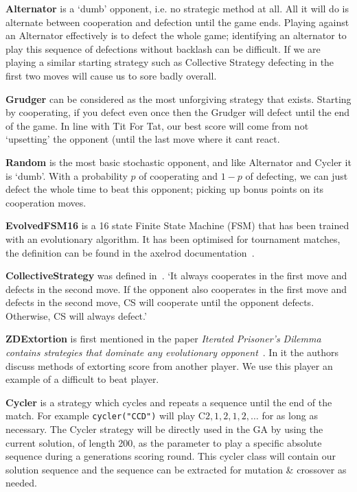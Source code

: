 \textbf{Alternator} is a `dumb' opponent, i.e. no strategic method at all. All it will do is alternate between cooperation and defection until the game ends. 
Playing against an Alternator effectively is to defect the whole game; identifying an alternator to play this sequence of defections without backlash can be difficult.
If we are playing a similar starting strategy such as Collective Strategy defecting in the first two moves will cause us to sore badly overall.

\textbf{Grudger} can be considered as the most unforgiving strategy that exists.
Starting by cooperating, if you defect even once then the Grudger will defect until the end of the game.
In line with Tit For Tat, our best score will come from not `upsetting' the opponent (until the last move where it cant react.

\textbf{Random} is the most basic stochastic opponent, and like Alternator and Cycler it is `dumb'. 
With a probability $p$ of cooperating and $1-p$ of defecting, we can just defect the whole time to beat this opponent; picking up bonus points on its cooperation moves.

\textbf{EvolvedFSM16} is a 16 state Finite State Machine (FSM) that has been trained with an evolutionary algorithm. It has been optimised for tournament matches, the definition can be found in the axelrod documentation~\cite{axelrodproject}.

\textbf{CollectiveStrategy} was defined in~\cite{li2009strategy}. ‘It always cooperates in the first move and defects in the second move. If the opponent also cooperates in the first move and defects in the second move, CS will cooperate until the opponent defects. Otherwise, CS will always defect.’

\textbf{ZDExtortion} is first mentioned in the paper \textit{Iterated Prisoner’s Dilemma contains strategies that dominate any evolutionary opponent}~\cite{press2012iterated}. In it the authors discuss methods of extorting score from another player. We use this player an example of a difficult to beat player.

\textbf{Cycler} is a strategy which cycles and repeats a sequence until the end of the match. 
For example \texttt{cycler("CCD")} will play C$2,1,2,1,2,\ldots$ for as long as necessary.
The Cycler strategy will be directly used in the GA by using the current solution, of length 200, as the parameter to play a specific absolute sequence during a generations scoring round.
This cycler class will contain our solution sequence and the sequence can be extracted for mutation \& crossover as needed.

